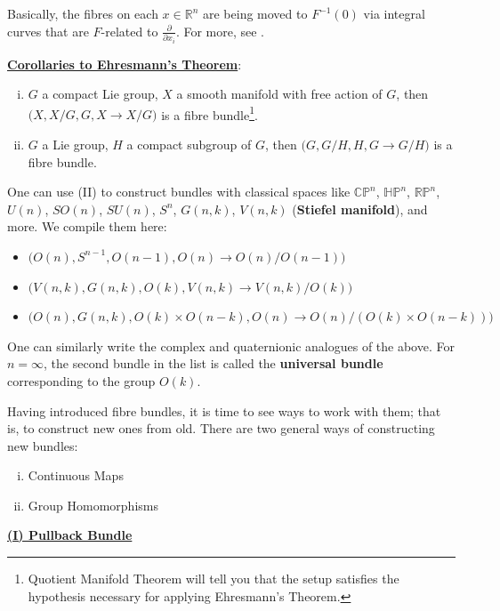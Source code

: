 \documentclass[11pt,a4paper]{article}
\begin{document}
\begin{remark}
    Basically, the fibres on each $x\in \mathbb{R}^n$ are being moved to $F^{-1}(0)$ via integral curves that are $F$-related to $\frac{\partial}{\partial x_i}$. For more, see \cite{guillemin2010differential}.
\end{remark}


\underline{\textbf{Corollaries to Ehresmann's Theorem}}:

\begin{enumerate}[(i)]
    \item $G$ a compact Lie group, $X$ a smooth manifold with free action of $G$, then $\big(X, X/G, G, X\rightarrow X/G\big)$ is a fibre bundle\footnote{Quotient Manifold Theorem will tell you that the setup satisfies the hypothesis necessary for applying Ehresmann's Theorem.}.
    \item $G$ a Lie group, $H$ a compact subgroup of $G$, then $\big(G, G/H, H, G\rightarrow G/H\big)$ is a fibre bundle.
\end{enumerate}

One can use (II) to construct bundles with classical spaces like $\mathbb{CP}^n$, $\mathbb{HP}^n$, $\mathbb{RP}^n$, $U(n)$, $SO(n)$, $SU(n)$, $S^n$, $G(n,k)$, $V(n,k)$ (\textbf{Stiefel manifold}), and more. We compile them here:

\begin{itemize}
    \item $\big(O(n), S^{n-1}, O(n-1), O(n) \rightarrow O(n)/O(n-1)\big)$
    \item $\big(V(n, k), G(n,k), O(k), V(n,k) \rightarrow V(n,k)/O(k)\big)$
    \item $\big(O(n), G(n,k), O(k)\times O(n-k), O(n)\rightarrow O(n)/(O(k)\times O(n-k))\big)$
\end{itemize}


One can similarly write the complex and quaternionic analogues of the above. For $n=\infty$, the second bundle in the list is called the \textbf{universal bundle} corresponding to the group $O(k)$.

Having introduced fibre bundles, it is time to see ways to work with them; that is, to construct new ones from old. There are two general ways of constructing new bundles:
\begin{enumerate}[(i)]
    \item Continuous Maps
    \item Group Homomorphisms
\end{enumerate}
\underline{\textbf{(I) Pullback Bundle}}
\end{document}
